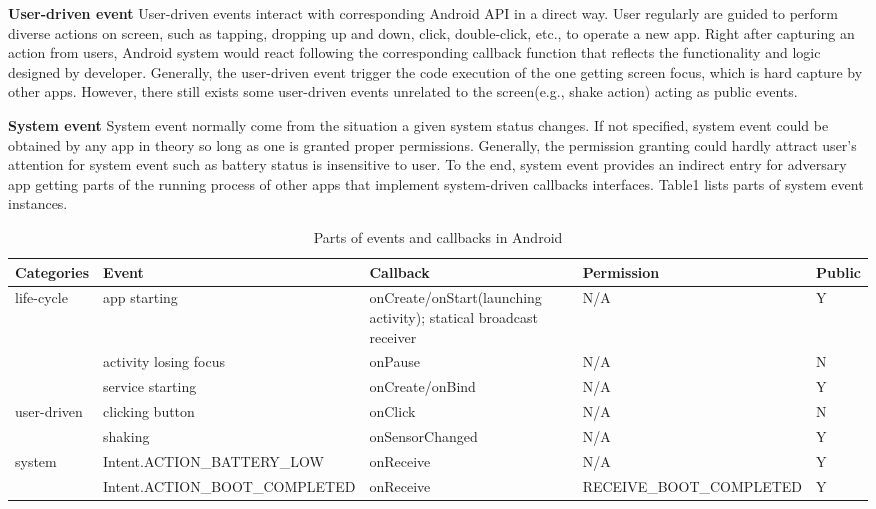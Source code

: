 \documentclass{sig-alternate-05-2015}
\begin{document}
\textbf{User-driven event} User-driven events interact with corresponding Android API in a direct way. User regularly are guided to perform diverse actions on screen, such as tapping, dropping up and down, click, double-click, etc., to operate a new app. Right after capturing an action from users, Android system would react following the  corresponding callback function that reflects the functionality and logic designed by developer. Generally, the user-driven event trigger the code execution of the one getting screen focus, which is hard capture by other apps. However, there still exists some user-driven events unrelated to the screen(e.g., shake action) acting as public events. 

\textbf{System event} System event normally come from the situation a given system status changes. If not specified, system event could be obtained by any app in theory so long as one is granted proper permissions. Generally, the permission granting could hardly attract user's attention for system event such as battery status is insensitive to user. To the end, system event provides an indirect entry for adversary app getting parts of the running process of other apps that implement system-driven callbacks interfaces. Table1 lists parts of system event instances.

\begin{table}[t]
\centering
 \caption{\label{tab:test}Parts of events and callbacks in Android}
 \begin{tabularx}{\linewidth}{XXXXX} 
  \toprule
  Categories & Event & Callback & Permission & Public \\
  \midrule
  life-cycle & app starting & onCreate/onStart(launching activity); statical broadcast receiver & N/A & Y\\
             & activity losing focus & onPause & N/A & N\\
             & service starting & onCreate/onBind & N/A & Y\\
             
  user-driven & clicking button & onClick & N/A & N\\
              & shaking & onSensorChanged & N/A & Y\\
              
  system  & Intent.ACTION\_BATTERY\_LOW & onReceive & N/A & Y \\
          & Intent.ACTION\_BOOT\_COMPLETED & onReceive & RECEIVE\_BOOT\_COMPLETED & Y \\
  
  \bottomrule
 \end{tabularx}
\end{table}
\end{document}

